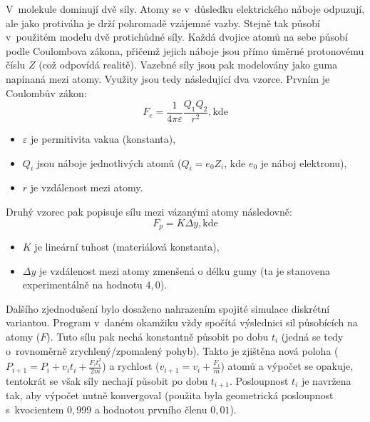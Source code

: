 V~molekule dominují dvě síly. Atomy se v~důsledku elektrického náboje odpuzují,
ale jako protiváha je drží pohromadě vzájemné vazby. Stejně tak působí
v~použitém modelu dvě protichůdné síly. Každá dvojice atomů na sebe působí podle
Coulombova zákona, přičemž jejich náboje jsou přímo úměrné protonovému číslu $Z$
(což odpovídá realitě). Vazebné síly jsou pak modelovány jako guma napínaná mezi
atomy. Využity jsou tedy následující dva vzorce. Prvním je Coulombův zákon:
$$F_e = \frac{1}{4\pi\varepsilon}\frac{Q_1 Q_2}{r^2}, \mathrm{kde}$$
\begin{itemize}
	\item $\varepsilon$ je permitivita vakua (konstanta),
	\item $Q_i$ jsou náboje jednotlivých atomů ($Q_i=e_0 Z_i$, kde $e_0$ je
	      náboj elektronu),
	\item $r$ je vzdálenost mezi atomy.
\end{itemize}

Druhý vzorec pak popisuje sílu mezi vázanými atomy následovně:
$$F_p = K \Delta y, \mathrm{kde}$$
\begin{itemize}
	\item $K$ je lineární tuhost (materiálová konstanta),
	\item $\Delta y$ je vzdálenost mezi atomy zmenšená o délku gumy (ta je
	      stanovena experimentálně na hodnotu $4,0$).
\end{itemize}

Dalšího zjednodušení bylo dosaženo nahrazením spojité simulace diskrétní
variantou. Program v~daném okamžiku vždy spočítá výslednici sil působících na
atomy ($F$). Tuto sílu pak nechá konstantně působit po dobu $t_i$ (jedná se tedy
o~rovnoměrně zrychlený/zpomalený pohyb). Takto je zjištěna nová poloha
($P_{i+1}=P_i + v_i t_i + \frac{F_i t_i^2}{2m}$) a rychlost
($v_{i+1}=v_i + \frac{F_i}{m}$) atomů a výpočet se opakuje, tentokrát se však
síly nechají působit po dobu $t_{i+1}$. Posloupnost $t_i$ je navržena tak, aby
výpočet nutně konvergoval (použita byla geometrická posloupnost s~kvocientem
$0,999$ a hodnotou prvního členu $0,01$).

